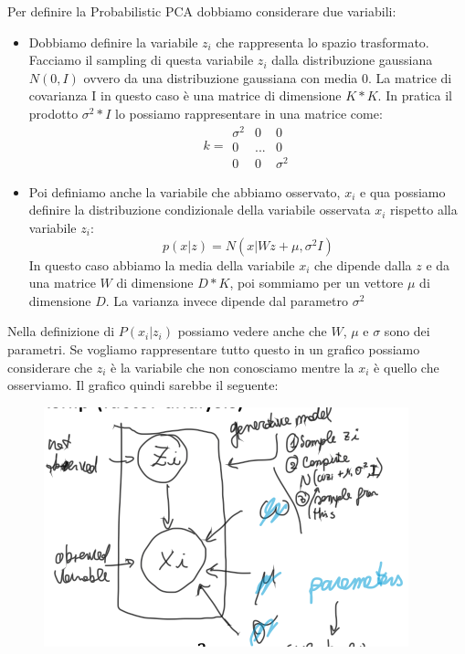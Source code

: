 \documentclass[14pt]{extreport}
\begin{document}
Per definire la Probabilistic PCA dobbiamo considerare due variabili:
\begin{itemize}
	\item Dobbiamo definire la variabile $z_i$ che rappresenta lo spazio trasformato. Facciamo il sampling di questa variabile $z_i$ dalla
	      distribuzione gaussiana $N(0,I)$ ovvero da una distribuzione gaussiana con media 0. La matrice di covarianza I in questo caso è una matrice
	      di dimensione $K*K$. In pratica il prodotto $\sigma^2*I$ lo possiamo rappresentare in una matrice come:
	      \begin{equation}
		      k = \begin{matrix}
			      \sigma^2 & 0   & 0        \\
			      0        & ... & 0        \\
			      0        & 0   & \sigma^2
		      \end{matrix}
	      \end{equation}
	\item Poi definiamo anche la variabile che abbiamo osservato, $x_i$ e qua possiamo definire la distribuzione condizionale della variabile
	      osservata $x_i$ rispetto alla variabile $z_i$: $$p(x|z) = N(x|Wz + \mu, \sigma^2I)$$ In questo caso abbiamo la media della variabile $x_i$
	      che dipende dalla $z$ e da una matrice $W$ di dimensione $D*K$, poi sommiamo per un vettore $\mu$ di dimensione $D$. La varianza invece
	      dipende dal parametro $\sigma^2$
\end{itemize}

Nella definizione di $P(x_i|z_i)$ possiamo vedere anche che $W$, $\mu$ e $\sigma$ sono dei parametri. Se vogliamo rappresentare tutto questo in un
grafico possiamo considerare che $z_i$ è la variabile che non conosciamo mentre la $x_i$ è quello che osserviamo. Il grafico quindi sarebbe il
seguente:


\begin{figure}[H]
	\centering
	\includegraphics[width=0.7\linewidth]{482.jpeg}
\end{figure}
\end{document}
